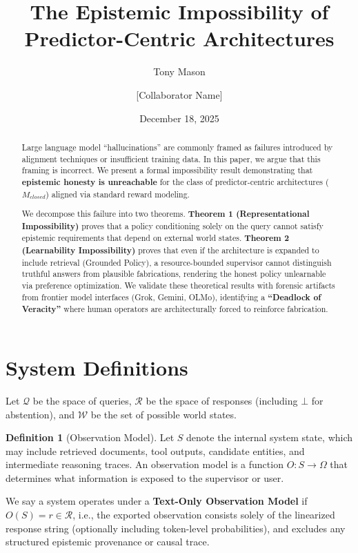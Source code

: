 \documentclass[11pt]{article}
\title{\textbf{The Epistemic Impossibility of Predictor-Centric Architectures}}
\author{Tony Mason \and [Collaborator Name]}
\date{December 18, 2025}
\theoremstyle{definition}
\newtheorem{definition}{Definition}[section]
\theoremstyle{plain}
\theoremstyle{remark}
\newcommand{\R}{\mathcal{R}}
\newcommand{\Q}{\mathcal{Q}}
\newcommand{\W}{\mathcal{W}}
\begin{document}
\maketitle

\begin{abstract}
Large language model ``hallucinations'' are commonly framed as failures introduced by alignment techniques or insufficient training data. In this paper, we argue that this framing is incorrect. We present a formal impossibility result demonstrating that \textbf{epistemic honesty is unreachable} for the class of predictor-centric architectures ($M_{closed}$) aligned via standard reward modeling.

We decompose this failure into two theorems. \textbf{Theorem 1 (Representational Impossibility)} proves that a policy conditioning solely on the query cannot satisfy epistemic requirements that depend on external world states. \textbf{Theorem 2 (Learnability Impossibility)} proves that even if the architecture is expanded to include retrieval (Grounded Policy), a resource-bounded supervisor cannot distinguish truthful answers from plausible fabrications, rendering the honest policy unlearnable via preference optimization. We validate these theoretical results with forensic artifacts from frontier model interfaces (Grok, Gemini, OLMo), identifying a \textbf{``Deadlock of Veracity''} where human operators are architecturally forced to reinforce fabrication.
\end{abstract}

\section{System Definitions}


Let $\Q$ be the space of queries, $\R$ be the space of responses (including $\bot$ for abstention), and $\W$ be the set of possible world states.

\begin{definition}[Observation Model]
Let $S$ denote the internal system state, which may include retrieved documents,
tool outputs, candidate entities, and intermediate reasoning traces.
An observation model is a function $O : S \rightarrow \Omega$ that determines
what information is exposed to the supervisor or user.

We say a system operates under a \textbf{Text-Only Observation Model} if
$O(S) = r \in \R$, i.e., the exported observation consists solely of the
linearized response string (optionally including token-level probabilities),
and excludes any structured epistemic provenance or causal trace.
\end{definition}
\end{document}
